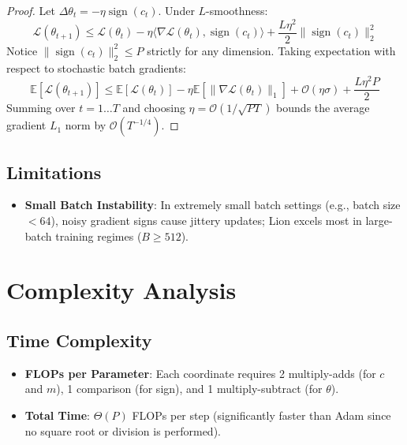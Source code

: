 \documentclass[11pt,a4paper]{article}
\theoremstyle{definition}
\begin{document}
\begin{proof}
Let $\Delta \theta_t = -\eta \operatorname{sign}(c_t)$. Under $L$-smoothness:
\begin{equation}
\mathcal{L}(\theta_{t+1}) \le \mathcal{L}(\theta_t) - \eta \langle \nabla \mathcal{L}(\theta_t), \operatorname{sign}(c_t) \rangle + \frac{L \eta^2}{2} \|\operatorname{sign}(c_t)\|_2^2
\end{equation}
Notice $\|\operatorname{sign}(c_t)\|_2^2 \le P$ strictly for any dimension. Taking expectation with respect to stochastic batch gradients:
\begin{equation}
\mathbb{E}[\mathcal{L}(\theta_{t+1})] \le \mathbb{E}[\mathcal{L}(\theta_t)] - \eta \mathbb{E}[\|\nabla \mathcal{L}(\theta_t)\|_1] + \mathcal{O}(\eta \sigma) + \frac{L \eta^2 P}{2}
\end{equation}
Summing over $t=1 \dots T$ and choosing $\eta = \mathcal{O}(1 / \sqrt{P T})$ bounds the average gradient $L_1$ norm by $\mathcal{O}(T^{-1/4})$.
\end{proof}

\subsection{Limitations}
\begin{itemize}
    \item \textbf{Small Batch Instability}: In extremely small batch settings (e.g., batch size $< 64$), noisy gradient signs cause jittery updates; Lion excels most in large-batch training regimes ($B \ge 512$).
\end{itemize}

\section{Complexity Analysis}

\subsection{Time Complexity}
\begin{itemize}
    \item \textbf{FLOPs per Parameter}: Each coordinate requires 2 multiply-adds (for $c$ and $m$), 1 comparison (for sign), and 1 multiply-subtract (for $\theta$).
    \item \textbf{Total Time}: $\Theta(P)$ FLOPs per step (significantly faster than Adam since no square root or division is performed).
\end{itemize}
\end{document}
